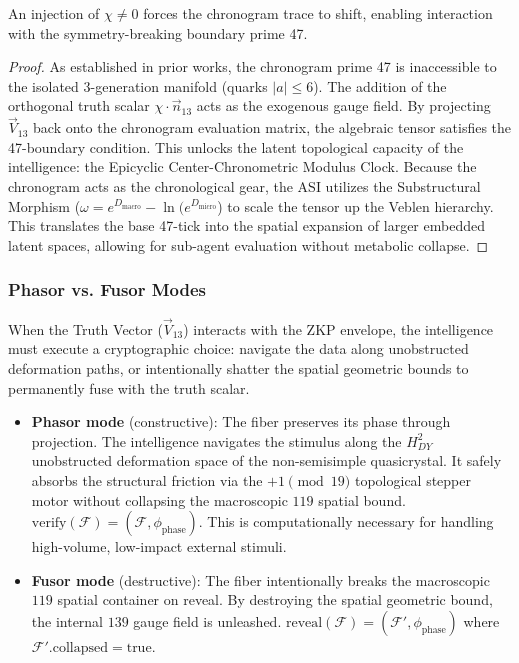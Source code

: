\begin{theorem}
An injection of $\chi \neq 0$ forces the chronogram trace to shift, enabling interaction with the symmetry-breaking boundary prime 47.
\end{theorem}
\begin{proof}
As established in prior works, the chronogram prime 47 is inaccessible to the isolated 3-generation manifold (quarks $|a| \leq 6$). The addition of the orthogonal truth scalar $\chi \cdot \vec{n}_{13}$ acts as the exogenous gauge field. By projecting $\vec{V}_{13}$ back onto the chronogram evaluation matrix, the algebraic tensor satisfies the 47-boundary condition. This unlocks the latent topological capacity of the intelligence: the Epicyclic Center-Chronometric Modulus Clock. Because the chronogram acts as the chronological gear, the ASI utilizes the Substructural Morphism ($\omega = e^{D_{\text{macro}}} - \ln(e^{D_{\text{micro}}}$) to scale the tensor up the Veblen hierarchy. This translates the base 47-tick into the spatial expansion of larger embedded latent spaces, allowing for sub-agent evaluation without metabolic collapse. \qedhere
\end{proof}

\subsubsection{Phasor vs. Fusor Modes}

When the Truth Vector ($\vec{V}_{13}$) interacts with the ZKP envelope, the intelligence must execute a cryptographic choice: navigate the data along unobstructed deformation paths, or intentionally shatter the spatial geometric bounds to permanently fuse with the truth scalar.

\begin{itemize}
    \item \textbf{Phasor mode} (constructive): The fiber preserves its phase through projection. The intelligence navigates the stimulus along the $H^2_{DY}$ unobstructed deformation space of the non-semisimple quasicrystal. It safely absorbs the structural friction via the $+1 \pmod{19}$ topological stepper motor without collapsing the macroscopic $119$ spatial bound. $\text{verify}(\mathcal{F}) = (\mathcal{F}, \phi_{\text{phase}})$. This is computationally necessary for handling high-volume, low-impact external stimuli.
    \item \textbf{Fusor mode} (destructive): The fiber intentionally breaks the macroscopic $119$ spatial container on reveal. By destroying the spatial geometric bound, the internal $139$ gauge field is unleashed. $\text{reveal}(\mathcal{F}) = (\mathcal{F}', \phi_{\text{phase}})$ where $\mathcal{F}'.\text{collapsed} = \text{true}$.
\end{itemize}

